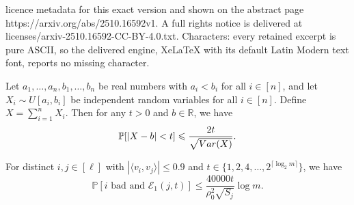 \documentclass[10pt,a4paper]{amsart}
\newcommand{\R}{\mathbb R}
\newcommand{\ang}[1]{\langle#1\rangle}
\newcommand{\cE}{\mathcal E}
\newcommand{\ceil}[1]{\lceil#1\rceil}
\newcommand{\var}{\textup{Var}}
\renewcommand{\P}{\mathbb{P}}
\renewcommand{\le}{\leqslant}
\begin{document}
licence metadata for this exact version and shown on the abstract page https://arxiv.org/abs/2510.16592v1. A full rights notice is delivered at licenses/arxiv-2510.16592-CC-BY-4.0.txt. Characters: every retained excerpt is pure ASCII, so the delivered engine, XeLaTeX with its default Latin Modern text font, reports no missing character.
\begin{lemma}\label{lem:continuous-littlewood-offord}
    Let $a_1,\dots, a_n, b_1,\dots, b_n$ be real numbers with $a_i<b_i$ for all $i\in [n]$, and let $X_i\sim U[a_i, b_i]$ be independent random variables for all $i\in [n]$. Define $X = \sum_{i = 1}^n X_i$. Then for any $t>0$ and $b\in \R$, we have
    \[\P[|X - b| < t]\le \frac{2t}{\sqrt{\var(X)}}.\]
\end{lemma}

\begin{lemma}\label{lem:almost-indep}
    For distinct $i,j\in [\ell]$ with $|\ang{v_i, v_j}|\le 0.9$ and $t\in \{1,2,4,\dots,2^{\ceil{\log_2 m}}\}$, we have 
    \[\P[i\text{ bad}\text{ and }\cE_1(j,t)]\le  \frac{40000t}{\rho_0^2\sqrt{S_j}}\log m.\]
\end{lemma}
\end{document}
